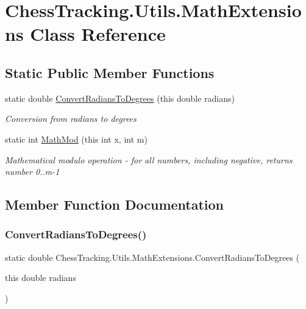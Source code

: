\hypertarget{class_chess_tracking_1_1_utils_1_1_math_extensions}{}\section{Chess\+Tracking.\+Utils.\+Math\+Extensions Class Reference}
\label{class_chess_tracking_1_1_utils_1_1_math_extensions}
\subsection*{Static Public Member Functions}
\begin{DoxyCompactItemize}
\item 
static double \mbox{\hyperlink{class_chess_tracking_1_1_utils_1_1_math_extensions_af93f894eb4c21b533615a6c8c7c2bf20}{Convert\+Radians\+To\+Degrees}} (this double radians)
\begin{DoxyCompactList}\small\item\em Conversion from radians to degrees \end{DoxyCompactList}\item 
static int \mbox{\hyperlink{class_chess_tracking_1_1_utils_1_1_math_extensions_a50e8ab853617eda2cc9a241a350b5419}{Math\+Mod}} (this int x, int m)
\begin{DoxyCompactList}\small\item\em Mathematical modulo operation -\/ for all numbers, including negative, returns number 0..m-\/1 \end{DoxyCompactList}\end{DoxyCompactItemize}


\subsection{Member Function Documentation}
\mbox{\label{class_chess_tracking_1_1_utils_1_1_math_extensions_af93f894eb4c21b533615a6c8c7c2bf20}} 
\subsubsection{\texorpdfstring{ConvertRadiansToDegrees()}{ConvertRadiansToDegrees()}}
{\footnotesize\ttfamily static double Chess\+Tracking.\+Utils.\+Math\+Extensions.\+Convert\+Radians\+To\+Degrees (\begin{DoxyParamCaption}\item[{this double}]{radians }\end{DoxyParamCaption})\hspace{0.3cm}{\ttfamily [static]}}



